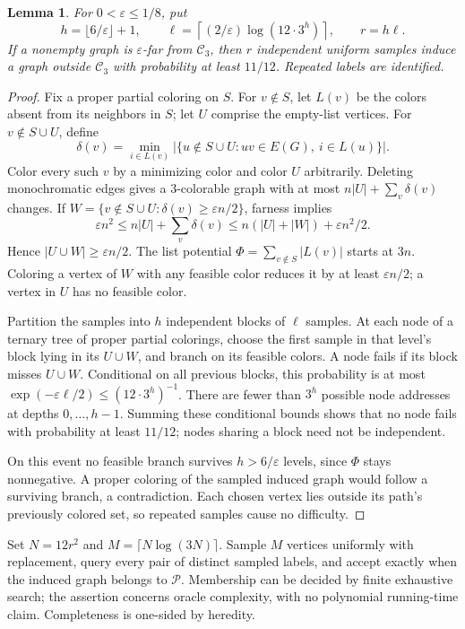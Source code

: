 \documentclass[11pt]{article}
\newtheorem{lemma}[theorem]{Lemma}
\newcommand{\Cthree}{\mathcal C_3}
\newcommand{\PP}{\mathcal P}
\newcommand{\eps}{\varepsilon}
\begin{document}
\begin{lemma}\label{lem:colour}
For $0<\eps\le1/8$, put
\[
 h=\lfloor6/\eps\rfloor+1,\qquad
 \ell=\left\lceil(2/\eps)\log(12\cdot3^h)\right\rceil,\qquad r=h\ell .
\]
If a nonempty graph is $\eps$-far from $\Cthree$, then $r$ independent
uniform samples induce a graph outside $\Cthree$ with probability at
least $11/12$. Repeated labels are identified.
\end{lemma}
\begin{proof}
Fix a proper partial coloring on $S$. For $v\notin S$, let $L(v)$ be
the colors absent from its neighbors in $S$; let $U$ comprise the
empty-list vertices. For $v\notin S\cup U$, define
\[
 \delta(v)=\min_{i\in L(v)}
 |\{u\notin S\cup U: uv\in E(G),\ i\in L(u)\}|.
\]
Color every such $v$ by a minimizing color and color $U$ arbitrarily.
Deleting monochromatic edges gives a $3$-colorable graph with at most
$n|U|+\sum_v\delta(v)$ changes. If
$W=\{v\notin S\cup U:\delta(v)\ge\eps n/2\}$, farness implies
\[
 \eps n^2\le n|U|+\sum_v\delta(v)
       \le n(|U|+|W|)+\eps n^2/2 .
\]
Hence $|U\cup W|\ge\eps n/2$. The list potential
$\Phi=\sum_{v\notin S}|L(v)|$ starts at $3n$. Coloring a vertex of
$W$ with any feasible color reduces it by at least $\eps n/2$;
a vertex in $U$ has no feasible color.

Partition the samples into $h$ independent blocks of $\ell$ samples.
At each node of a ternary tree of proper partial colorings, choose the
first sample in that level's block lying in its $U\cup W$, and branch
on its feasible colors. A node fails if its block misses $U\cup W$.
Conditional on all previous blocks, this probability is at most
$\exp(-\eps\ell/2)\le(12\cdot3^h)^{-1}$. There are fewer than $3^h$
possible node addresses at depths $0,\ldots,h-1$. Summing these
conditional bounds shows that no node fails with probability at least
$11/12$; nodes sharing a block need not be independent.

On this event no feasible branch survives $h>6/\eps$ levels, since
$\Phi$ stays nonnegative. A proper coloring of the sampled induced
graph would follow a surviving branch, a contradiction. Each chosen
vertex lies outside its path's previously colored set, so repeated
samples cause no difficulty.
\end{proof}

Set $N=12r^2$ and $M=\lceil N\log(3N)\rceil$. Sample $M$ vertices
uniformly with replacement, query every pair of distinct sampled
labels, and accept exactly when the induced graph belongs to $\PP$.
Membership can be decided by finite exhaustive search; the assertion
concerns oracle complexity, with no polynomial running-time claim.
Completeness is one-sided by heredity.
\end{document}
